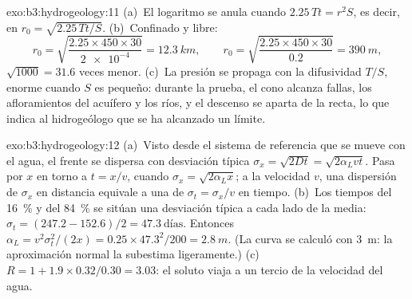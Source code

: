 \begin{solution}{exo:b3:hydrogeology:11}
(a)~El logaritmo se anula cuando $2.25\,Tt = r^2S$, es decir, en $r_0 =
\sqrt{2.25\,Tt/S}$. (b)~Confinado y libre:
\[
r_0 = \sqrt{\frac{2.25\times450\times30}{\num{2e-4}}} = \qty{12.3}{km},
\qquad r_0 = \sqrt{\frac{2.25\times450\times30}{0.2}} = \qty{390}{m},
\]
$\sqrt{1000} = 31.6$ veces menor. (c)~La presión
se propaga con la difusividad $T/S$, enorme cuando $S$ es pequeño: durante
la prueba, el cono alcanza fallas, los afloramientos del acuífero y los ríos,
y el descenso se aparta de la recta, lo que indica al
hidrogeólogo que se ha alcanzado un límite.
\end{solution}

\begin{solution}{exo:b3:hydrogeology:12}
(a)~Visto desde el sistema de referencia que se mueve con el agua, el frente se dispersa con
desviación típica $\sigma_x = \sqrt{2Dt} = \sqrt{2\alpha_Lvt}$. Pasa por
$x$ en torno a $t = x/v$, cuando $\sigma_x = \sqrt{2\alpha_Lx}$; a la velocidad
$v$, una dispersión de $\sigma_x$ en distancia equivale a una de $\sigma_t = \sigma_x/v$
en tiempo. (b)~Los tiempos del \qty{16}{\percent} y del \qty{84}{\percent} se sitúan una
desviación típica a cada lado de la media: $\sigma_t = (247.2 -
152.6)/2 = \num{47.3}~\text{días}$. Entonces $\alpha_L = v^2\sigma_t^2/(2x) =
0.25\times47.3^2/200 = \qty{2.8}{m}$. (La curva se calculó con
\qty{3}{m}: la aproximación normal la subestima ligeramente.) (c)~$R =
1 + 1.9\times0.32/0.30 = \num{3.03}$: el soluto viaja a un tercio de la
velocidad del agua.
\end{solution}

